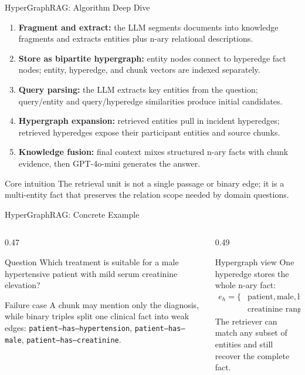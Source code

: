 
\begin{frame}{HyperGraphRAG: Algorithm Deep Dive}
\scriptsize
\begin{enumerate}
  \item \textbf{Fragment and extract:} the LLM segments documents into knowledge fragments and extracts entities plus n-ary relational descriptions.
  \item \textbf{Store as bipartite hypergraph:} entity nodes connect to hyperedge fact nodes; entity, hyperedge, and chunk vectors are indexed separately.
  \item \textbf{Query parsing:} the LLM extracts key entities from the question; query/entity and query/hyperedge similarities produce initial candidates.
  \item \textbf{Hypergraph expansion:} retrieved entities pull in incident hyperedges; retrieved hyperedges expose their participant entities and source chunks.
  \item \textbf{Knowledge fusion:} final context mixes structured n-ary facts with chunk evidence, then GPT-4o-mini generates the answer.
\end{enumerate}
\begin{block}{Core intuition}
The retrieval unit is not a single passage or binary edge; it is a multi-entity fact that preserves the relation scope needed by domain questions.
\end{block}
\end{frame}

\begin{frame}{HyperGraphRAG: Concrete Example}
\scriptsize
\begin{columns}[T,onlytextwidth]
  \begin{column}{0.47\textwidth}
    \begin{block}{Question}
      Which treatment is suitable for a male hypertensive patient with mild serum creatinine elevation?
    \end{block}
    \begin{block}{Failure case}
      A chunk may mention only the diagnosis, while binary triples split one clinical fact into weak edges:
      \texttt{patient--has--hypertension}, \texttt{patient--has--male}, \texttt{patient--has--creatinine}.
    \end{block}
  \end{column}
  \begin{column}{0.49\textwidth}
    \begin{block}{Hypergraph view}
      One hyperedge stores the whole n-ary fact:
      \begin{align*}
      e_h = \{&\text{patient}, \text{male}, \text{hypertension},\\
              &\text{creatinine range}, \text{treatment note}\}
      \end{align*}
      The retriever can match any subset of entities and still recover the complete fact.
    \end{block}
  \end{column}
\end{columns}
\end{frame}

